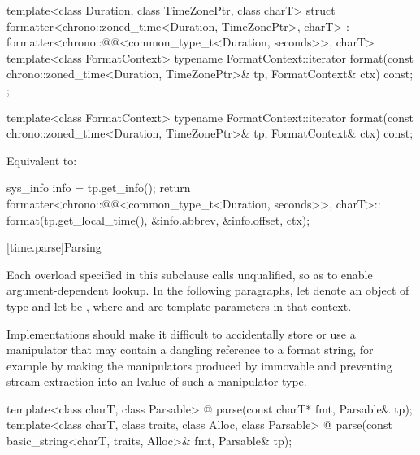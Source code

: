 %
\begin{codeblock}
template<class Duration, class TimeZonePtr, class charT>
struct formatter<chrono::zoned_time<Duration, TimeZonePtr>, charT>
    : formatter<chrono::@@<common_type_t<Duration, seconds>>, charT> {
  template<class FormatContext>
    typename FormatContext::iterator
      format(const chrono::zoned_time<Duration, TimeZonePtr>& tp, FormatContext& ctx) const;
};
\end{codeblock}

%
\begin{itemdecl}
template<class FormatContext>
  typename FormatContext::iterator
    format(const chrono::zoned_time<Duration, TimeZonePtr>& tp, FormatContext& ctx) const;
\end{itemdecl}

\begin{itemdescr}
\pnum
\effects
Equivalent to:
\begin{codeblock}
sys_info info = tp.get_info();
return formatter<chrono::@@<common_type_t<Duration, seconds>>, charT>::
         format({tp.get_local_time(), &info.abbrev, &info.offset}, ctx);
\end{codeblock}
\end{itemdescr}

%

[time.parse]{Parsing}

%

\pnum
Each  overload specified in this subclause
calls  unqualified,
so as to enable argument-dependent lookup.
In the following paragraphs,
let  denote an object of type  and
let  be ,
where  and  are template parameters in that context.

\pnum
\recommended
Implementations should make it difficult to accidentally store or use
a manipulator that may contain a dangling reference to a format string,
for example by making the manipulators produced by  immovable and
preventing stream extraction into an lvalue of such a manipulator type.

\begin{itemdecl}
template<class charT, class Parsable>
  @\unspec@
    parse(const charT* fmt, Parsable& tp);
template<class charT, class traits, class Alloc, class Parsable>
  @\unspec@
    parse(const basic_string<charT, traits, Alloc>& fmt, Parsable& tp);
\end{itemdecl}

